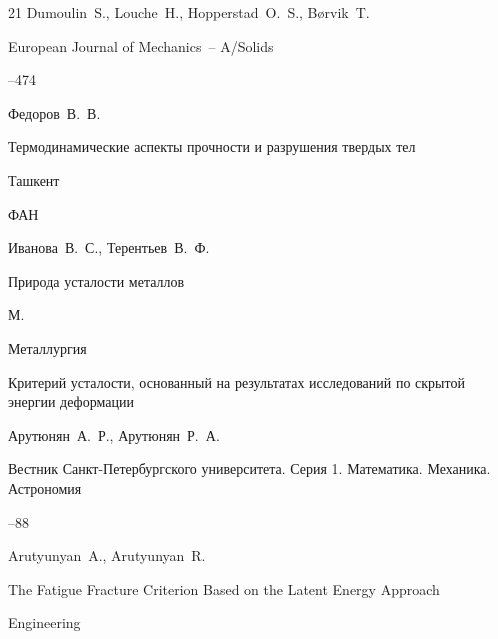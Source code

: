 \begin{thebibliography}{21}
\by Dumoulin~S., Louche~H., Hopperstad~O.~S., B{\o}rvik~T.

\jour European Journal of Mechanics~-- A/Solids




--474





\by Федоров~В.~В.

\book Термодинамические аспекты прочности и разрушения твердых тел

\publaddr Ташкент

\publ ФАН






\by Иванова~В.~С., Терентьев~В.~Ф.

\book Природа усталости металлов

\publaddr М.

\publ Металлургия






\paper Критерий усталости, основанный на результатах исследований по скрытой энергии деформации

\by Арутюнян~А.~Р., Арутюнян~Р.~А.

\jour Вестник Санкт-Петербургского университета. Серия 1. Математика. Механика. Астрономия



--88





\by Arutyunyan~A., Arutyunyan~R.

\paper The Fatigue Fracture Criterion Based on the Latent Energy Approach

\jour Engineering




\end{thebibliography}
